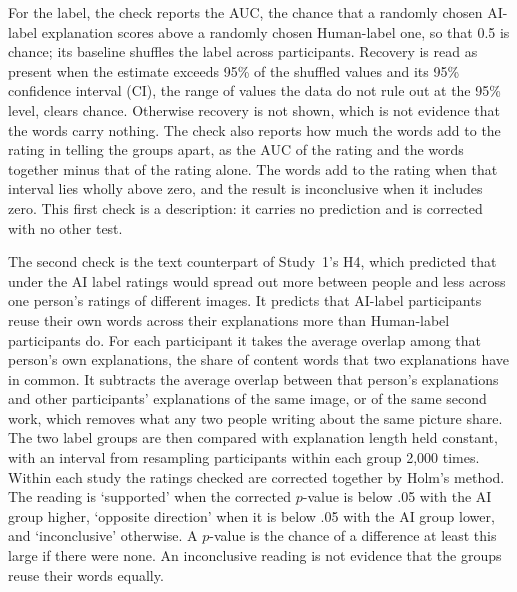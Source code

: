For the label, the check reports the AUC, the chance that a randomly chosen AI-label explanation scores above a randomly chosen Human-label one, so that 0.5 is chance; its baseline shuffles the label across participants. Recovery is read as present when the estimate exceeds 95\% of the shuffled values and its 95\% confidence interval (CI), the range of values the data do not rule out at the 95\% level, clears chance. Otherwise recovery is not shown, which is not evidence that the words carry nothing. The check also reports how much the words add to the rating in telling the groups apart, as the AUC of the rating and the words together minus that of the rating alone. The words add to the rating when that interval lies wholly above zero, and the result is inconclusive when it includes zero. This first check is a description: it carries no prediction and is corrected with no other test.

The second check is the text counterpart of Study~1's H4, which predicted that under the AI label ratings would spread out more between people and less across one person's ratings of different images. It predicts that AI-label participants reuse their own words across their explanations more than Human-label participants do. For each participant it takes the average overlap among that person's own explanations, the share of content words that two explanations have in common. It subtracts the average overlap between that person's explanations and other participants' explanations of the same image, or of the same second work, which removes what any two people writing about the same picture share. The two label groups are then compared with explanation length held constant, with an interval from resampling participants within each group 2,000 times. Within each study the ratings checked are corrected together by Holm's method.\cite{holm1979simple} The reading is `supported' when the corrected $p$-value is below .05 with the AI group higher, `opposite direction' when it is below .05 with the AI group lower, and `inconclusive' otherwise. A $p$-value is the chance of a difference at least this large if there were none. An inconclusive reading is not evidence that the groups reuse their words equally.

